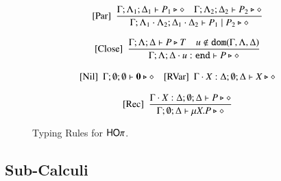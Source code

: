 \begin{figure}[t]
\[\begin{array}{c}
		\trule{Par}~~\tree{
			\Gamma; \Lambda_{1}; \Delta_{1} \proves P_{1} \hastype \Proc \quad \Gamma; \Lambda_{2}; \Delta_{2} \proves P_{2} \hastype \Proc
		}{
			\Gamma; \Lambda_{1} \cat \Lambda_2; \Delta_{1} \cat \Delta_2 \proves P_1 \Par P_2 \hastype \Proc
		}
\\[6mm]
		\trule{Close}~~\tree{
			\Gamma; \Lambda; \Delta  \proves P \hastype T \quad u \not\in \dom{\Gamma, \Lambda,\Delta}
		}{
			\Gamma; \Lambda; \Delta \cat u: \tinact  \proves P \hastype \Proc
		}
		\\[6mm]

		\trule{Nil}~~\Gamma; \emptyset; \emptyset \proves \inact \hastype \Proc
\quad 
		\trule{RVar}~~\Gamma \cat \rvar{X}: \Delta; \emptyset; \Delta  \proves \rvar{X} \hastype \Proc
\\[4mm]

	 	\trule{Rec}~~\tree{
			\Gamma \cat \rvar{X}: \Delta; \emptyset; \Delta  \proves P \hastype \Proc
		}{
			\Gamma ; \emptyset; \Delta  \proves \recp{X}{P} \hastype \Proc
		}


%
%
%
	\end{array}
\]
\caption{Typing Rules for $\mathsf{HO}\pi$.\label{fig:typerulesmy}}
\end{figure}




\subsection{Sub-Calculi}
\label{subsec:subcalculi}







